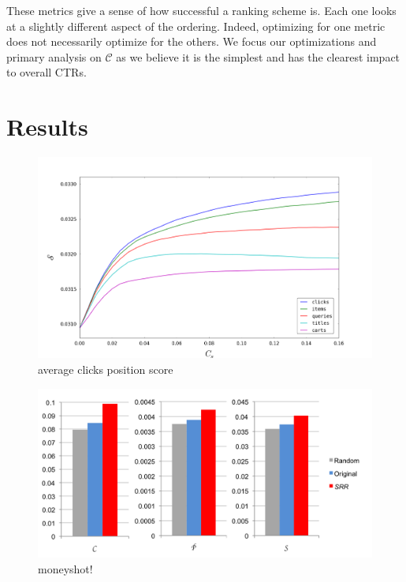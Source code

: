 \documentclass{article}
\begin{document}
These metrics give a sense of how successful a ranking scheme is. Each one looks at a slightly 
different aspect of the ordering. Indeed, optimizing for one metric does not necessarily 
optimize for the others. We focus our optimizations and primary analysis on $\mathscr{C}$
as we believe it is the simplest and has the clearest impact to overall CTRs.

\section{Results}

\begin{figure}[htbp!]
    \centering
    \includegraphics[width=\textwidth]{000050_0_48chunk_k100_i2_n100_avg_click_position_score_0-0_16.png}
    \caption{average clicks position score}
    \label{fig:avg_clicks_position_score}
\end{figure}

\begin{figure}[htbp!]
    \centering
    \includegraphics[width=\textwidth]{moneyshot.png}
    \caption{moneyshot!}
    \label{fig:}
\end{figure}
\end{document}
